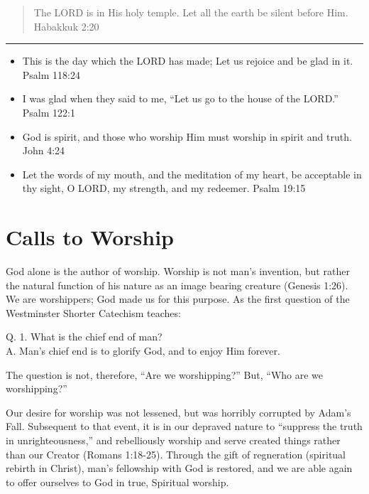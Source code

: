 \documentclass[]{book}
\begin{document}
\begin{quote}
The LORD is in His holy temple. Let all the earth be silent before Him.
\textbar{} Habakkuk 2:20
\end{quote}

\begin{center}\rule{0.5\linewidth}{\linethickness}\end{center}

\begin{itemize}
\item
  This is the day which the LORD has made; Let us rejoice and be glad in
  it. \textbar{} Psalm 118:24
\item
  I was glad when they said to me, ``Let us go to the house of the
  LORD.'' \textbar{} Psalm 122:1
\item
  God is spirit, and those who worship Him must worship in spirit and
  truth. \textbar{} John 4:24
\item
  Let the words of my mouth, and the meditation of my heart, be
  acceptable in thy sight, O LORD, my strength, and my redeemer.
  \textbar{} Psalm 19:15
\end{itemize}

\chapter*{Calls to Worship}\label{calls-to-worship}

God alone is the author of worship. Worship is not man's invention, but
rather the natural function of his nature as an image bearing creature
(Genesis 1:26). We are worshippers; God made us for this purpose. As the
first question of the Westminster Shorter Catechism teaches:

Q. 1. What is the chief end of man?\\
A. Man's chief end is to glorify God, and to enjoy Him forever.

The question is not, therefore, ``Are we worshipping?'' But, ``Who are
we worshipping?''

Our desire for worship was not lessened, but was horribly corrupted by
Adam's Fall. Subsequent to that event, it is in our depraved nature to
``suppress the truth in unrighteousness,'' and rebelliously worship and
serve created things rather than our Creator (Romans 1:18-25). Through
the gift of regneration (spiritual rebirth in Christ), man's fellowship
with God is restored, and we are able again to offer ourselves to God in
true, Spiritual worship.
\end{document}
